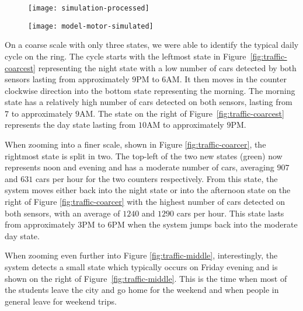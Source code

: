 \begin{figure*}[th!]
  	\centering
  	\begin{subfigure}[b]{.48\textwidth}
	  	\centering
	  	\texttt{[image: simulation-processed]}
  		\caption{\label{fig:simulation-chart}}
	\end{subfigure}
  	\begin{subfigure}[b]{.48\textwidth}
	  	\centering
	  	\texttt{[image: model-motor-simulated]}
  		\caption{\label{fig:simulation-model}}
	\end{subfigure}
  	\caption{Simulation of an electric motor plotted as a standard time-chart \ref{fig:simulation-chart} and our qualitative model \ref{fig:simulation-model}. We see the cyclical behavior of the motor warming up to the large state on the upper right and then subsequently cooling down. }
  	\label{fig:example-motor}
\end{figure*}

On a coarse scale with only three states, we were able to identify the typical daily cycle on the ring. The cycle starts with the leftmost state in Figure~\ref{fig:traffic-coarcest} representing the night state with a low number of cars detected by both sensors lasting from approximately $9$PM to $6$AM. It then moves in the counter clockwise direction into the bottom state representing the morning. The morning state has a relatively high number of cars detected on both sensors, lasting from $7$ to approximately $9$AM. The state on the right of Figure~\ref{fig:traffic-coarcest} represents the day state lasting from $10$AM to approximately $9$PM.

When zooming into a finer scale, shown in Figure \ref{fig:traffic-coarcer}, the rightmost state is split in two. The top-left of the two new states (green) now represents noon and evening and has a moderate number of cars, averaging $907$ and $631$ cars per hour for the two counters respectively. From this state, the system moves either back into the night state or into the afternoon state on the right of Figure \ref{fig:traffic-coarcer} with the highest number of cars detected on both sensors, with an average of $1240$ and $1290$ cars per hour. This state lasts from approximately $3$PM to $6$PM when the system jumps back into the moderate day state.



When zooming even further into Figure \ref{fig:traffic-middle}, interestingly, the system detects a small state which typically occurs on Friday evening and is shown on the right of Figure~\ref{fig:traffic-middle}. This is the time when most of the students leave the city and go home for the weekend and when people in general leave for weekend trips.

